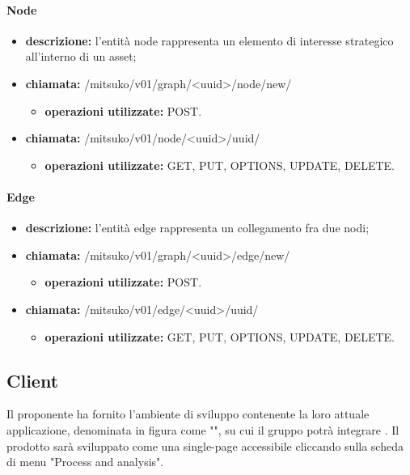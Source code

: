 \paragraph{Node}
\begin{itemize}
	\item \textbf{descrizione:} l'entità node rappresenta un elemento di interesse strategico all'interno di un asset;
	\item \textbf{chiamata:} /mitsuko/v01/graph/<uuid>/node/new/
	\begin{itemize}\item \textbf{operazioni utilizzate:} POST.\end{itemize}
	\item \textbf{chiamata:} /mitsuko/v01/node/<uuid>/uuid/
	\begin{itemize}\item \textbf{operazioni utilizzate:} GET, PUT, OPTIONS, UPDATE, DELETE.\end{itemize}
\end{itemize}

\paragraph{Edge}
\begin{itemize}
	\item \textbf{descrizione:} l'entità edge rappresenta un collegamento fra due nodi;
	\item \textbf{chiamata:} /mitsuko/v01/graph/<uuid>/edge/new/
	\begin{itemize}\item \textbf{operazioni utilizzate:} POST.\end{itemize}
	\item \textbf{chiamata:} /mitsuko/v01/edge/<uuid>/uuid/
	\begin{itemize}\item \textbf{operazioni utilizzate:} GET, PUT, OPTIONS, UPDATE, DELETE.\end{itemize}
\end{itemize}

\newpage
\subsection{Client}
Il proponente ha fornito l'ambiente di sviluppo contenente la loro attuale applicazione, denominata in figura come "\riskapp", su cui il gruppo potrà integrare \progetto. Il prodotto sarà sviluppato come una single-page accessibile cliccando sulla scheda di menu "Process and analysis".

